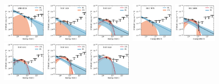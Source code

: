 \documentclass[doublespace,nopageskip]{VTthesis} %
\begin{document}
\begin{appendices}
\begin{figure}
\centering
\includegraphics[width=0.19\textwidth]{Figures/Globular/spectra/2comp_0.pdf}
\includegraphics[width=0.19\textwidth]{Figures/Globular/spectra/2comp_4.pdf}
\includegraphics[width=0.19\textwidth]{Figures/Globular/spectra/2comp_16.pdf}
\includegraphics[width=0.19\textwidth]{Figures/Globular/spectra/2comp_26.pdf}
\includegraphics[width=0.19\textwidth]{Figures/Globular/spectra/2comp_7.pdf}
\includegraphics[width=0.19\textwidth]{Figures/Globular/spectra/2comp_14.pdf}
\includegraphics[width=0.19\textwidth]{Figures/Globular/spectra/2comp_21.pdf}
\includegraphics[width=0.19\textwidth]{Figures/Globular/spectra/2comp_20.pdf}

\end{figure}
\end{appendices}
\end{document}
